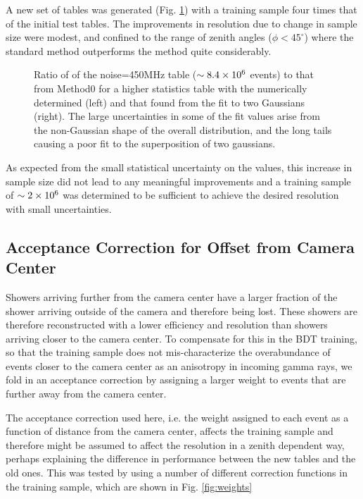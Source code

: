 \documentclass[main.tex]{subfiles}
\begin{document}
A new set of \disp tables was generated (Fig. \ref{fig:disp_ratio_450x4}) with a training sample four times that of the initial test tables. The improvements in resolution due to change in sample size were modest, and confined to the range of zenith angles ($\phi <45^\circ$) where the standard method outperforms the \disp method quite considerably.

\begin{figure}[htbp]
  \centering
  \caption[Higher statistics \disp table reconstruction vs noise.]{Ratio of \rse of the noise=450MHz \disp table ($\sim 8.4\times 10^{6}$ events) to that from Method0 for a higher statistics \disp table with the numerically determined \rse (left) and that found from the fit to two Gaussians (right). The large uncertainties in some of the fit values arise from the non-Gaussian shape of the overall distribution, and the long tails causing a poor fit to the superposition of two gaussians.}
  \label{fig:disp_ratio_450x4}
\end{figure}

As expected from the small statistical uncertainty on the \rse values, this increase in sample size did not lead to any meaningful improvements and a training sample of $\sim 2\times 10^{6}$ was determined to be sufficient to achieve the desired resolution with small uncertainties.

\subsection{Acceptance Correction for Offset from Camera Center}
Showers arriving further from the camera center have a larger fraction of the shower arriving outside of the camera and therefore being lost. These showers are therefore reconstructed with a lower efficiency and resolution than showers arriving closer to the camera center. To compensate for this in the BDT training, so that the training sample does not mis-characterize the overabundance of events closer to the camera center as an anisotropy in incoming gamma rays, we fold in an acceptance correction by assigning a larger weight to events that are further away from the camera center.

The acceptance correction used here, i.e. the weight assigned to each event as a function of distance from the camera center, affects the training sample and therefore might be assumed to affect the resolution in a zenith dependent way, perhaps explaining the difference in performance between the new \disp tables and the old ones. This was tested by using a number of different correction functions in the training sample, which are shown in Fig. \ref{fig:weights}
\end{document}
